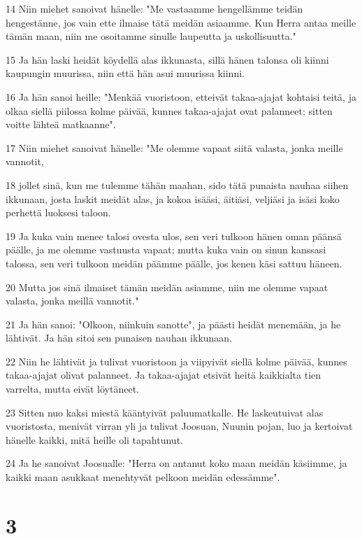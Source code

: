 \par 14 Niin miehet sanoivat hänelle: "Me vastaamme hengellämme teidän hengestänne, jos vain ette ilmaise tätä meidän asiaamme. Kun Herra antaa meille tämän maan, niin me osoitamme sinulle laupeutta ja uskollisuutta."
\par 15 Ja hän laski heidät köydellä alas ikkunasta, sillä hänen talonsa oli kiinni kaupungin muurissa, niin että hän asui muurissa kiinni.
\par 16 Ja hän sanoi heille: "Menkää vuoristoon, etteivät takaa-ajajat kohtaisi teitä, ja olkaa siellä piilossa kolme päivää, kunnes takaa-ajajat ovat palanneet; sitten voitte lähteä matkaanne".
\par 17 Niin miehet sanoivat hänelle: "Me olemme vapaat siitä valasta, jonka meille vannotit,
\par 18 jollet sinä, kun me tulemme tähän maahan, sido tätä punaista nauhaa siihen ikkunaan, josta laskit meidät alas, ja kokoa isääsi, äitiäsi, veljiäsi ja isäsi koko perhettä luoksesi taloon.
\par 19 Ja kuka vain menee talosi ovesta ulos, sen veri tulkoon hänen oman päänsä päälle, ja me olemme vastuusta vapaat; mutta kuka vain on sinun kanssasi talossa, sen veri tulkoon meidän päämme päälle, jos kenen käsi sattuu häneen.
\par 20 Mutta jos sinä ilmaiset tämän meidän asiamme, niin me olemme vapaat valasta, jonka meillä vannotit."
\par 21 Ja hän sanoi: "Olkoon, niinkuin sanotte", ja päästi heidät menemään, ja he lähtivät. Ja hän sitoi sen punaisen nauhan ikkunaan.
\par 22 Niin he lähtivät ja tulivat vuoristoon ja viipyivät siellä kolme päivää, kunnes takaa-ajajat olivat palanneet. Ja takaa-ajajat etsivät heitä kaikkialta tien varrelta, mutta eivät löytäneet.
\par 23 Sitten nuo kaksi miestä kääntyivät paluumatkalle. He laskeutuivat alas vuoristosta, menivät virran yli ja tulivat Joosuan, Nuunin pojan, luo ja kertoivat hänelle kaikki, mitä heille oli tapahtunut.
\par 24 Ja he sanoivat Joosualle: "Herra on antanut koko maan meidän käsiimme, ja kaikki maan asukkaat menehtyvät pelkoon meidän edessämme".

\chapter{3}

